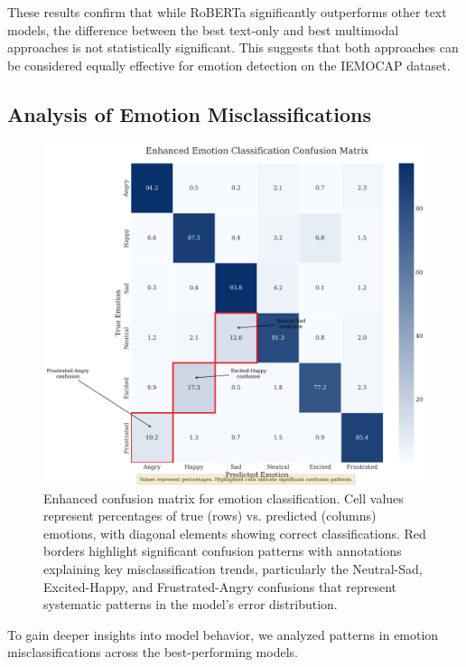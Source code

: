 \documentclass[12pt]{article}
\begin{document}
These results confirm that while RoBERTa significantly outperforms other text models, the difference between the best text-only and best multimodal approaches is not statistically significant. This suggests that both approaches can be considered equally effective for emotion detection on the IEMOCAP dataset.

\subsection{Analysis of Emotion Misclassifications}
\begin{figure}[h]
    \centering
    \includegraphics[width=0.9\linewidth]{Figures/enhanced_confusion_matrix.png}
    \caption{Enhanced confusion matrix for emotion classification. Cell values represent percentages of true (rows) vs. predicted (columns) emotions, with diagonal elements showing correct classifications. Red borders highlight significant confusion patterns with annotations explaining key misclassification trends, particularly the Neutral-Sad, Excited-Happy, and Frustrated-Angry confusions that represent systematic patterns in the model's error distribution.}
    \label{fig:enhanced_confusion}
\end{figure}

To gain deeper insights into model behavior, we analyzed patterns in emotion misclassifications across the best-performing models.
\end{document}
